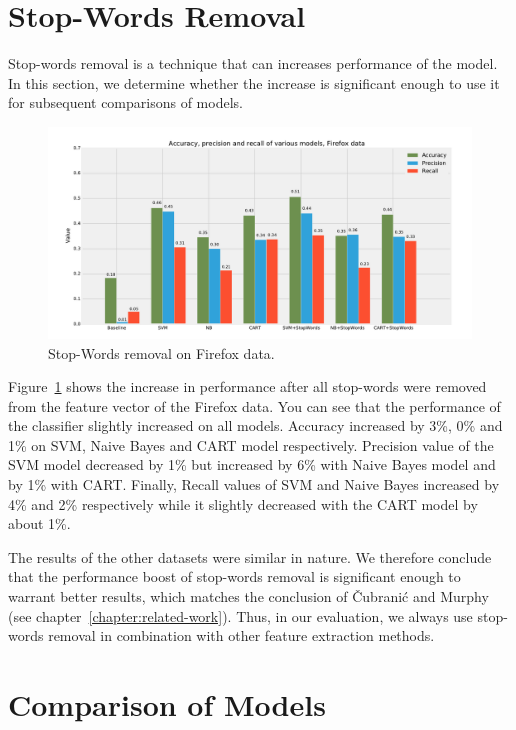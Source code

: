 \section{Stop-Words Removal}

Stop-words removal is a technique that can increases performance of the model. In this section, we determine whether the increase is significant enough to use it for subsequent comparisons of models.

\begin{figure}[htbp]
    \centering
        \includegraphics[width=\textwidth]{./images/comparison_of_models/firefox_0.pdf}
    \caption{Stop-Words removal on Firefox data.}
    \label{fig:models.firefox.stopwords}
\end{figure}

Figure~\ref{fig:models.firefox.stopwords} shows the increase in performance after all stop-words were removed from the feature vector of the Firefox data. You can see that the performance of the classifier slightly increased on all models. Accuracy increased by 3\%, 0\% and 1\% on SVM, Naive Bayes and CART model respectively. Precision value of the SVM model decreased by 1\% but increased by 6\% with Naive Bayes model and by 1\% with CART. Finally, Recall values of SVM and Naive Bayes increased by 4\% and 2\% respectively while it slightly decreased with the CART model by about 1\%.

The results of the other datasets were similar in nature. We therefore conclude that the performance boost of stop-words removal is significant enough to warrant better results, which matches the conclusion of Čubranić and Murphy~\cite{Murphy} (see chapter~\ref{chapter:related-work}). Thus, in our evaluation, we always use stop-words removal in combination with other feature extraction methods.

\section{Comparison of Models}


